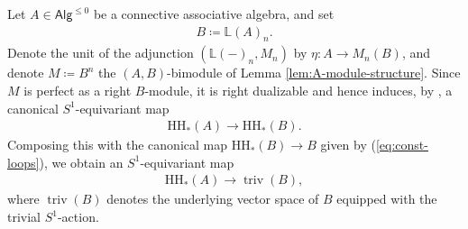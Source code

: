 \documentclass{article}
\numberwithin{equation}{section}
\theoremstyle{quest}
\theoremstyle{definition}
\theoremstyle{remark}
\DeclareMathOperator{\triv}{triv}
\begin{document}
Let $A \in \mathsf{Alg}^{\le 0}$ be a connective associative algebra, and set
\begin{align*}
	B\coloneqq \mathbb{L}(A)_n.
\end{align*} 
Denote the unit of the adjunction $(\mathbb{L}(-)_n,M_n)$ by $\eta:A\to M_n(B)$, and denote $M\coloneqq B^n$ the $(A,B)$-bimodule of Lemma \ref{lem:A-module-structure}. Since $M$ is perfect as a right $B$-module, it is right dualizable and hence induces, by \cite[Theorem 2.14]{HSS}, a canonical $S^1$-equivariant map
\begin{align*}
	\mathrm H\mathrm H_*(A)\to \mathrm H\mathrm H_*(B).
\end{align*} 
Composing this with the canonical map $\mathrm H\mathrm H_*(B)\to B$ given by (\ref{eq:const-loops}), we obtain an $S^1$-equivariant map
\begin{align}\label{eq:trace}
	\mathrm H\mathrm H_*(A)\to \triv(B),
\end{align} 
where $\triv(B)$ denotes the underlying vector space of $B$ equipped with the trivial $S^1$-action.
\end{document}
